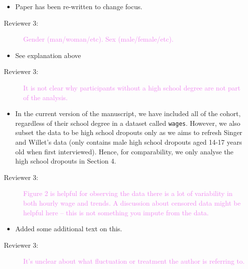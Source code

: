 \documentclass[12pt,a4paper,]{article}
\providecommand{\tightlist}{%
  \setlength{\itemsep}{0pt}\setlength{\parskip}{0pt}}
\begin{document}
\begin{itemize}
\tightlist
\item
  Paper has been re-written to change focus.
\end{itemize}

\begin{description}
\item[Reviewer 3:]\textcolor{violet}{Gender (man/woman/etc). Sex (male/female/etc).} 
\end{description}

\begin{itemize}
\tightlist
\item
  See explanation above
\end{itemize}

\begin{description}
\item[Reviewer 3:]\textcolor{violet}{It is not clear why participants without a high school degree are not part of the analysis.} 
\end{description}

\begin{itemize}
\tightlist
\item
  In the current version of the manuscript, we have included all of the cohort, regardless of their school degree in a dataset called \texttt{wages}. However, we also subset the data to be high school dropouts only as we aims to refresh Singer and Willet's data (only contains male high school dropouts aged 14-17 years old when first interviewed). Hence, for comparability, we only analyse the high school dropouts in Section 4.
\end{itemize}

\begin{description}
\item[Reviewer 3:]\textcolor{violet}{Figure 2 is helpful for observing the data there is a lot of variability in both hourly wage and trends. A discussion about censored data might be helpful here – this is not something you impute from the data.} 
\end{description}

\begin{itemize}
\tightlist
\item
  Added some additional text on this.
\end{itemize}

\begin{description}
\item[Reviewer 3:]\textcolor{violet}{It’s unclear about what fluctuation or treatment the author is referring to.}
\end{description}
\end{document}
